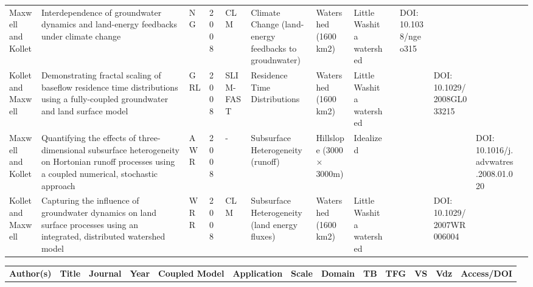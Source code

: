 {{\begin{tabular}{ p{1cm} p{2cm} p{0.75cm} p{0.5cm} p{1cm} p{1.5cm} p{1cm} p{1cm} p{0.25cm} p{0.25cm} p{0.25cm} p{0.25cm} p{1cm} }
Maxwell and Kollet & Interdependence of groundwater dynamics and land-energy feedbacks under climate change & NG & 2008 & CLM & Climate Change (land-energy feedbacks to groudnwater) & Watershed (1600 km2) & Little Washita watershed &  & DOI: 10.1038/ngeo315 \\
Kollet and Maxwell & Demonstrating fractal scaling of baseflow residence time distributions using a fully-coupled groundwater and land surface model & GRL & 2008 & SLIM-FAST & Residence Time Distributions  & Watershed (1600 km2) & Little Washita watershed &  &  & DOI: 10.1029/2008GL033215  \\
Maxwell and Kollet & Quantifying the effects of three-dimensional subsurface heterogeneity on Hortonian runoff processes using a coupled numerical, stochastic approach & AWR & 2008 & - & Subsurface Heterogeneity (runoff) & Hillslope (3000  × 3000m) & Idealized &  &  &  & DOI: 10.1016/j.advwatres.2008.01.020 \\
Kollet and Maxwell & Capturing the influence of groundwater dynamics on land surface processes using an integrated, distributed watershed model & WRR & 2008 & CLM & Subsurface Heterogeneity (land energy fluxes) & Watershed (1600 km2) & Little Washita watershed &  &  & DOI: 10.1029/2007WR006004 \\
\end{tabular}

\begin{tabular}{ p{1cm} p{2cm} p{0.75cm} p{0.5cm} p{1cm} p{1.5cm} p{1cm} p{1cm} p{0.25cm} p{0.25cm} p{0.25cm} p{0.25cm} p{1cm} }
\bf{Author(s)} & \bf{Title} & \bf{Journal} & \bf{Year} & \bf{Coupled Model} & \bf{Application} & \bf{Scale} & \bf{Domain} & \bf{TB} & \bf{TFG} & \bf{VS} & \bf{Vdz} & \bf{Access/DOI} \\   


\end{tabular}}}
